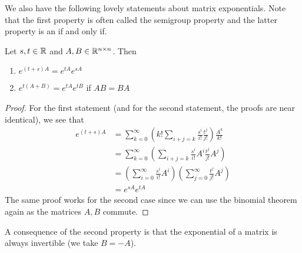 We also have the following lovely statements about matrix exponentials. Note that the first property is often called the semigroup property and the latter property is an if and only if.
\begin{lemma} Let $s, t \in \mathbb{R}$ and $A, B \in \mathbb{R}^{n \times n}$. Then
\begin{enumerate}
    \item $e^{(t + s)A} = e^{tA} e^{sA}$
    \item $e^{t(A + B)} = e^{tA} e^{tB}$ if $AB = BA$
\end{enumerate}
\end{lemma}
\begin{proof}
For the first statement (and for the second statement, the proofs are near identical), we see that
\begin{align*}
    e^{(t + s)A} &= \sum_{k = 0}^{\infty} \left( k! \sum_{i + j = k} \frac{s^i}{i!} \frac{t^j}{j!} \right) \frac{A^k}{k!} \\
    &= \sum_{k = 0}^{\infty} \left( \sum_{i + j = k} \frac{s^i}{i!} A^i \frac{t^j}{j!} A^j  \right)\\
    &= \left( \sum_{i = 0}^{\infty} \frac{s^i}{i!} A^i \right) \left( \sum_{j = 0}^{\infty} \frac{t^j}{j!} A^j \right)\\
    &= e^{sA} e^{tA}
\end{align*}
The same proof works for the second case since we can use the binomial theorem again as the matrices $A, B$ commute.
\end{proof}
A consequence of the second property is that the exponential of a matrix is always invertible (we take $B = -A$). 

